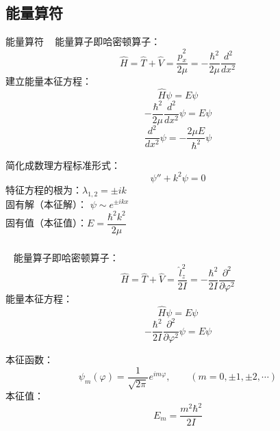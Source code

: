\subsection{能量算符}

\begin{frame} {能量算符}
    \解~ 能量算子即哈密顿算子：
    $$ \hat{H}=\hat{T}+\hat{V}=\frac{\hat{p}_x ^2 }{2\mu} = -\frac{\hbar^2}{2\mu}\frac{d^2}{dx^2} $$
    建立能量本征方程：
    $$ \hat{H} \psi =E \psi $$
    $$ -\frac{\hbar^2}{2\mu}\frac{d^2}{dx^2} \psi =E \psi $$
    $$ \frac{d^2}{dx^2} \psi = -\frac{2\mu E}{\hbar^2} \psi $$
\end{frame}

\begin{frame} 
    简化成数理方程标准形式：
    $$  \psi'' + k^2 \psi =0 $$
    特征方程的根为：$\lambda_{1,2}=\pm ik$ \\ \vspace{0.6em}
    固有解（本征解）： $\psi \sim e^{\pm ikx}$  \\
    固有值（本征值）：$ E= \dfrac{\hbar^2 k^2 }{2\mu} $
\end{frame}


\begin{frame} 
    \frametitle{ }
    \例[5.求转动惯量为I的平面转子的能量本征值和本征态]{} 
    \解~ 能量算子即哈密顿算子：
    $$ \hat{H}=\hat{T}+\hat{V}=\frac{\hat{l}_z ^2 }{2I} = -\frac{\hbar^2}{2I}\frac{\partial^2}{\partial\varphi^2} $$
    能量本征方程：
    $$ \hat{H} \psi =E \psi $$
    $$ -\frac{\hbar^2}{2I}\frac{\partial^2}{\partial\varphi^2} \psi =E \psi $$
\end{frame}

\begin{frame} 
    本征函数： $$\psi_m(\varphi)=\frac{1}{\sqrt{2\pi}}e^{im\varphi}, \qquad (m=0,\pm 1, \pm 2, \cdots)$$
    本征值： $$ E_m=\frac{m^2\hbar^2}{2I} $$     
\end{frame}

